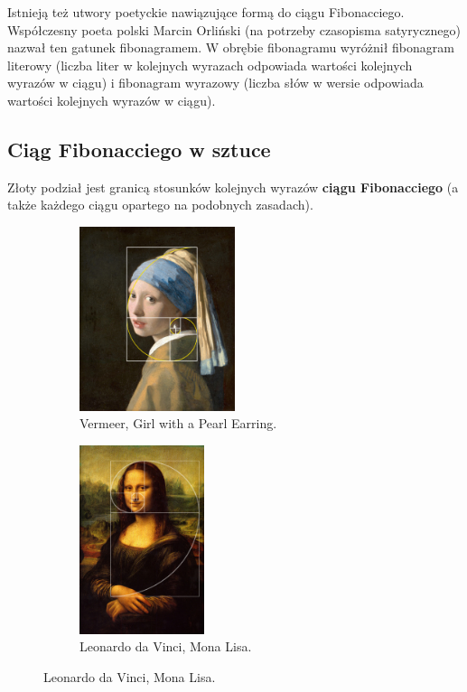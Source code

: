 \documentclass[12pt,a4paper]{article}
\begin{document}
Istnieją też utwory poetyckie nawiązujące formą do ciągu Fibonacciego. Współczesny poeta polski Marcin Orliński (na potrzeby czasopisma satyrycznego) nazwał ten gatunek fibonagramem. W obrębie fibonagramu wyróżnił fibonagram literowy (liczba liter w kolejnych wyrazach odpowiada wartości kolejnych wyrazów w ciągu) i fibonagram wyrazowy (liczba słów w wersie odpowiada wartości kolejnych wyrazów w ciągu).
\subsection{\large{Ciąg Fibonacciego w sztuce}}
Złoty podział jest granicą stosunków kolejnych wyrazów \textbf{ciągu Fibonacciego} (a także każdego ciągu opartego na podobnych zasadach).
\begin{figure}[h]
\begin{subfigure}{.5\textwidth}
\centering
\includegraphics[width=0.5\textwidth]{girlpearl}
\caption{Vermeer, Girl with a Pearl Earring.}
\label{Vermeer, Girl with a Pearl Earring.}
\end{subfigure}
\begin{subfigure}{.5\textwidth}
\centering
\includegraphics[width=0.4\textwidth]{monalisa}
\caption{Leonardo da Vinci, Mona Lisa.}
\label{Leonardo da Vinci, Mona Lisa.}
\end{subfigure}
\end{figure}
\end{document}
